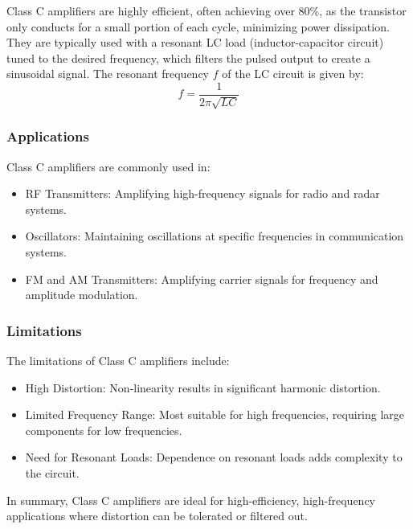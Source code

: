 \documentclass[12pt,a4paper]{article}
\begin{document}
    Class C amplifiers are highly efficient, often achieving over 80\%, as the transistor only conducts for a small portion of each cycle, minimizing power dissipation. They are typically used with a resonant LC load (inductor-capacitor circuit) tuned to the desired frequency, which filters the pulsed output to create a sinusoidal signal. The resonant frequency \( f \) of the LC circuit is given by:
    \[
    f = \frac{1}{2 \pi \sqrt{LC}}
    \]

    \subsubsection{Applications}
    Class C amplifiers are commonly used in:
    \begin{itemize}
        \item RF Transmitters: Amplifying high-frequency signals for radio and radar systems.
        \item Oscillators: Maintaining oscillations at specific frequencies in communication systems.
        \item FM and AM Transmitters: Amplifying carrier signals for frequency and amplitude modulation.
    \end{itemize}

    \subsubsection{Limitations}
    The limitations of Class C amplifiers include:
    \begin{itemize}
        \item High Distortion: Non-linearity results in significant harmonic distortion.
        \item Limited Frequency Range: Most suitable for high frequencies, requiring large components for low frequencies.
        \item Need for Resonant Loads: Dependence on resonant loads adds complexity to the circuit.
    \end{itemize}

    In summary, Class C amplifiers are ideal for high-efficiency, high-frequency applications where distortion can be tolerated or filtered out.
\end{document}
